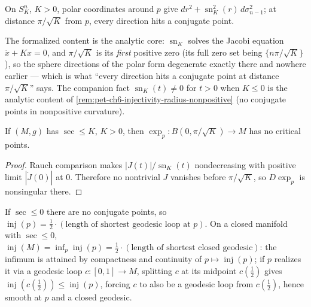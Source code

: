 \begin{example}
  \label{ex:pet-ch6-conjugate-point-space-form}


  On $S^n_K$, $K>0$, polar coordinates around $p$ give
  $dr^2+\operatorname{sn}_K^2(r)\,d\sigma_{n-1}^2$; at distance $\pi/\sqrt K$ from $p$,
  every direction hits a conjugate point.

  The formalized content is the analytic core: $\operatorname{sn}_K$ solves the
  Jacobi equation $\ddot x+Kx=0$, and $\pi/\sqrt K$ is its \emph{first} positive
  zero (its full zero set being $\{n\pi/\sqrt K\}$), so the sphere directions of
  the polar form degenerate exactly there and nowhere earlier — which is what
  ``every direction hits a conjugate point at distance $\pi/\sqrt K$'' says. The
  companion fact $\operatorname{sn}_K(t)\ne0$ for $t>0$ when $K\le0$ is the
  analytic content of \cref{rem:pet-ch6-injectivity-radius-nonpositive}
  (no conjugate points in nonpositive curvature).
\end{example}

\begin{theorem}
  \label{thm:pet-ch6-conjugate-radius-bound}


  If $(M,g)$ has $\sec\le K$, $K>0$, then
  $\exp_p:B(0,\pi/\sqrt K)\to M$ has no critical points.
\end{theorem}
\begin{proof}
  \sketch
  Rauch comparison makes \(|J(t)|/\operatorname{sn}_K(t)\) nondecreasing with positive limit \(|\dot J(0)|\) at \(0\). Therefore no nontrivial \(J\) vanishes before \(\pi/\sqrt K\), so \(D\exp_p\) is nonsingular there.
\end{proof}

\begin{remark}
  \label{rem:pet-ch6-injectivity-radius-nonpositive}


  If $\sec\le0$ there are no conjugate points, so
  $\operatorname{inj}(p)=\tfrac12\cdot(\text{length of shortest geodesic loop at }p)$.
  On a closed manifold with $\sec\le0$,
  $\operatorname{inj}(M)=\inf_p\operatorname{inj}(p)=\tfrac12\cdot(\text{length of shortest closed
  geodesic})$: the infimum is attained by compactness and continuity of
  $p\mapsto\operatorname{inj}(p)$; if $p$ realizes it via a geodesic loop $c:[0,1]\to M$,
  splitting $c$ at its midpoint $c(\tfrac12)$ gives
  $\operatorname{inj}(c(\tfrac12))\le\operatorname{inj}(p)$, forcing $c$ to also be a geodesic loop
  from $c(\tfrac12)$, hence smooth at $p$ and a closed geodesic.
\end{remark}

